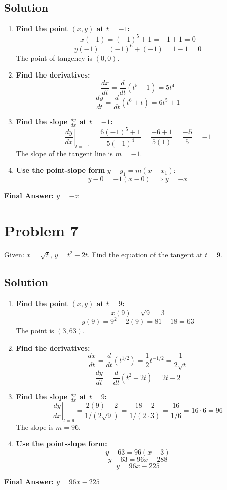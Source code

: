 \documentclass{article}
\begin{document}
\subsection*{Solution}
\begin{enumerate}
    \item \textbf{Find the point $(x,y)$ at $t=-1$:}
    \[ x(-1) = (-1)^5 + 1 = -1 + 1 = 0 \]
    \[ y(-1) = (-1)^6 + (-1) = 1 - 1 = 0 \]
    The point of tangency is $(0,0)$.
    \item \textbf{Find the derivatives:}
    \[ \frac{dx}{dt} = \frac{d}{dt}(t^5 + 1) = 5t^4 \]
    \[ \frac{dy}{dt} = \frac{d}{dt}(t^6 + t) = 6t^5 + 1 \]
    \item \textbf{Find the slope $\frac{dy}{dx}$ at $t=-1$:}
    \[ \left.\frac{dy}{dx}\right|_{t=-1} = \frac{6(-1)^5 + 1}{5(-1)^4} = \frac{-6 + 1}{5(1)} = \frac{-5}{5} = -1 \]
    The slope of the tangent line is $m = -1$.
    \item \textbf{Use the point-slope form} $y - y_1 = m(x - x_1)$:
    \[ y - 0 = -1(x - 0) \implies y = -x \]
\end{enumerate}
\textbf{Final Answer:} $y = -x$

\section{Problem 7}
Given: $x = \sqrt{t}$, $y = t^2 - 2t$. Find the equation of the tangent at $t = 9$.

\subsection*{Solution}
\begin{enumerate}
    \item \textbf{Find the point $(x,y)$ at $t=9$:}
    \[ x(9) = \sqrt{9} = 3 \]
    \[ y(9) = 9^2 - 2(9) = 81 - 18 = 63 \]
    The point is $(3, 63)$.
    \item \textbf{Find the derivatives:}
    \[ \frac{dx}{dt} = \frac{d}{dt}(t^{1/2}) = \frac{1}{2}t^{-1/2} = \frac{1}{2\sqrt{t}} \]
    \[ \frac{dy}{dt} = \frac{d}{dt}(t^2 - 2t) = 2t - 2 \]
    \item \textbf{Find the slope $\frac{dy}{dx}$ at $t=9$:}
    \[ \left.\frac{dy}{dx}\right|_{t=9} = \frac{2(9) - 2}{1/(2\sqrt{9})} = \frac{18 - 2}{1/(2 \cdot 3)} = \frac{16}{1/6} = 16 \cdot 6 = 96 \]
    The slope is $m = 96$.
    \item \textbf{Use the point-slope form:}
    \[ y - 63 = 96(x - 3) \]
    \[ y - 63 = 96x - 288 \]
    \[ y = 96x - 225 \]
\end{enumerate}
\textbf{Final Answer:} $y = 96x - 225$
\end{document}

